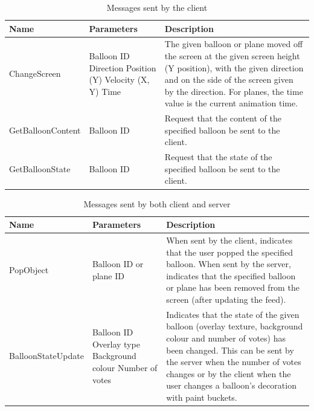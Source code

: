 \begin{table}
\begin{tabular}{|>{\raggedright}p{4.3cm}|>{\raggedright}p{2.8cm}|>{\raggedright}p{8.7cm}|}
\hline 
Name & Parameters & Description\tabularnewline
\hline 
ChangeScreen
& Balloon ID 
\newline Direction
\newline Position (Y)
\newline Velocity (X, Y)
\newline Time
& The given balloon or plane moved off the screen at the given screen height (Y position),
with the given direction and on the side of the screen given by the direction. For planes,
the time value is the current animation time.
\tabularnewline
\hline 
GetBalloonContent
& Balloon ID
& Request that the content of the specified balloon be sent to the client.
\tabularnewline
\hline 
GetBalloonState
& Balloon ID
& Request that the state of the specified balloon be sent to the client.
\tabularnewline
\hline 
\end{tabular}

\caption{Messages sent by the client}

\label{ClientMessages}
\end{table}

\begin{table}
\begin{tabular}{|>{\raggedright}p{4.3cm}|>{\raggedright}p{2.8cm}|>{\raggedright}p{8.7cm}|}
\hline 
Name & Parameters & Description\tabularnewline
\hline 
PopObject
& Balloon ID or plane ID
& When sent by the client, indicates that the user popped the specified balloon.
When sent by the server, indicates that the specified balloon or plane has been 
removed from the screen (after updating the feed).
\tabularnewline
\hline 
BalloonStateUpdate
& Balloon ID
\newline Overlay type
\newline Background colour
\newline Number of votes
& Indicates that the state of the given balloon (overlay texture, background colour
and number of votes) has been changed. This can be sent by the server when the 
number of votes changes or by the client when the user changes a balloon's 
decoration with paint buckets.
\tabularnewline
\hline 
\end{tabular}

\caption{Messages sent by both client and server}

\label{CommonMessages}
\end{table}


